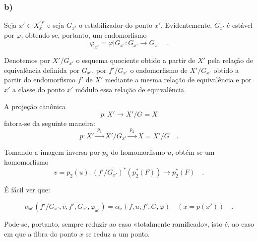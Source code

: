 \subsubsection*{b)} Seja $x'\in X_x^{\prime f'}$ e seja $G_{x'}$ o estabilizador do ponto $x'$. Evidentemente, $G_{x'}$ é estável por $\varphi$, obtendo-se, portanto, um endomorfismo
\[
\varphi_{x'} = \varphi|G_{x'} : G_{x'} \longrightarrow G_{x'} \quad .
\]

Denotemos por $X'/G_{x'}$ o esquema quociente obtido a partir de $X'$ pela relação de equivalência definida por $G_{x'}$, por $f'/G_{x'}$ o endomorfismo de $X'/G_{x'}$ obtido a partir do endomorfismo $f'$ de $X'$ mediante a mesma relação de equivalência e por $x'$ a classe do ponto $x'$ módulo essa relação de equivalência.%

A projeção canônica
\[
p : X' \longrightarrow X'/G = X
\]
fatora-se da seguinte maneira:
\[
p : X' \xrightarrow{\;p_1\;} X'/G_{x'} \xrightarrow{\;p_2\;} X = X'/G \quad .
\]

Tomando a imagem inversa por $p_2$ do homomorfismo $u$, obtém-se um homomorfismo
\[
v = p_2(u) : (f'/G_{x'})^*(p_2^*(F)) \longrightarrow p_2^*(F) \quad .
\]

É fácil ver que:

\begin{equation}\tag{6.4.3}
\alpha_{x'}(f'/G_{x'}, v, f', G_{x'}, \varphi_{x'}) = \alpha_x(f,u, f', G, \varphi) \quad (x = p(x')) \quad .
\end{equation}

Pode-se, portanto, sempre reduzir ao caso «totalmente ramificado», isto é, ao caso em que a fibra do ponto $x$ se reduz a um ponto.
